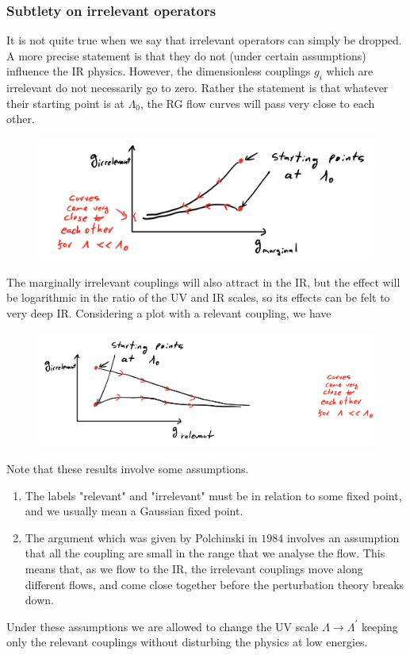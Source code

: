 \subsubsection{Subtlety on irrelevant operators} 
It is not quite true when we say that irrelevant operators can simply be dropped. A more precise statement is that they do not (under certain assumptions) influence the IR physics. However, the dimensionless couplings $g_i$ which are irrelevant do not necessarily go to zero. Rather the statement is that whatever their starting point is at $\Lambda_0$, the RG flow curves will pass very close to each other. 

\begin{figure}[h!]
	\centering
	\includegraphics[width=0.7\linewidth]{gfx/RG1}
	\caption{}
	\label{fig:rg1}
\end{figure}

The marginally irrelevant couplings will also attract in the IR, but the effect will be logarithmic in the ratio 
of the UV and IR scales, so its effects can be felt to very deep IR. Considering a plot with a relevant coupling, we have

\begin{figure}[h!]
	\centering
	\includegraphics[width=0.7\linewidth]{gfx/RG2}
	\caption{}
	\label{fig:rg2}
\end{figure}

Note that these results involve some assumptions.
\begin{enumerate}
	\item The labels "relevant" and "irrelevant" must be in relation to some fixed point, and we usually mean a Gaussian fixed point. 
	\item The argument which was given by Polchinski in $1984$ involves an assumption that all the coupling are small in the range that we analyse the flow. This means that, as we flow to the IR, the irrelevant couplings move along different flows, and come close together before the perturbation theory breaks down.
\end{enumerate}
Under these assumptions we are allowed to change the UV scale $\Lambda \rightarrow \Lambda^\prime$ keeping only the relevant couplings without disturbing the physics at low energies.




